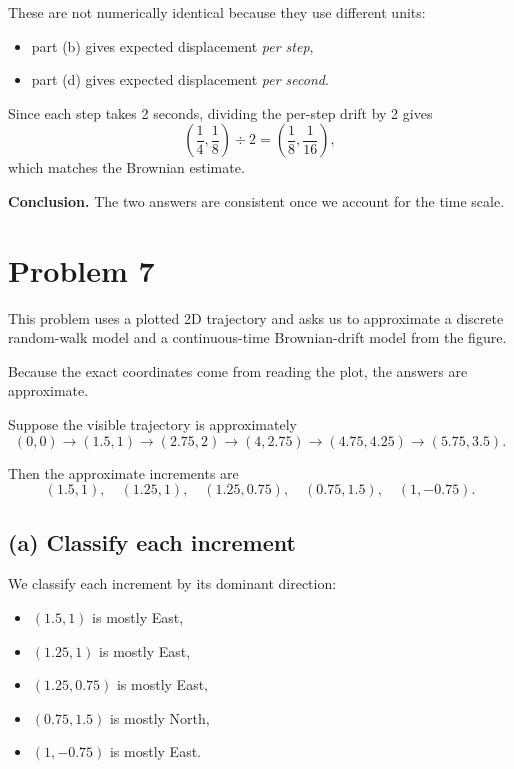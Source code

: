 \documentclass[11pt]{article}
\begin{document}
These are not numerically identical because they use different units:
\begin{itemize}[leftmargin=1.5em]
    \item part (b) gives expected displacement \emph{per step},
    \item part (d) gives expected displacement \emph{per second}.
\end{itemize}

Since each step takes 2 seconds, dividing the per-step drift by 2 gives
\[
\left(\frac14,\frac18\right)\div 2
=
\left(\frac18,\frac1{16}\right),
\]
which matches the Brownian estimate.

\bigskip
\noindent
\textbf{Conclusion.}  
The two answers are consistent once we account for the time scale.

\newpage

\section*{Problem 7}

This problem uses a plotted 2D trajectory and asks us to approximate a discrete random-walk model and a continuous-time Brownian-drift model from the figure.

Because the exact coordinates come from reading the plot, the answers are approximate.

Suppose the visible trajectory is approximately
\[
(0,0)\to(1.5,1)\to(2.75,2)\to(4,2.75)\to(4.75,4.25)\to(5.75,3.5).
\]

Then the approximate increments are
\[
(1.5,1),\quad (1.25,1),\quad (1.25,0.75),\quad (0.75,1.5),\quad (1,-0.75).
\]

\subsection*{(a) Classify each increment}

We classify each increment by its dominant direction:
\begin{itemize}[leftmargin=1.5em]
    \item $(1.5,1)$ is mostly East,
    \item $(1.25,1)$ is mostly East,
    \item $(1.25,0.75)$ is mostly East,
    \item $(0.75,1.5)$ is mostly North,
    \item $(1,-0.75)$ is mostly East.
\end{itemize}
\end{document}
